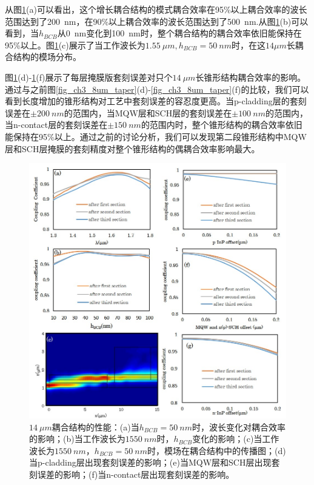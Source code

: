 从图\ref{fig_ch3_14um_taper}(a)可以看出，这个增长耦合结构的模式耦合效率在95\%以上耦合效率的波长范围达到了200~nm，在90\%以上耦合效率的波长范围达到了500~nm.从图\ref{fig_ch3_14um_taper}(b)可以看到，当$h_{BCB}$从0~nm变化到100~nm时，整个耦合结构的耦合效率依旧能保持在95\%以上。图\ref{fig_ch3_14um_taper}(c)展示了当工作波长为$1.55 ~\mu m, h_{BCB} = 50~nm$时，在这$14 \mu m$长耦合结构的模场分布。

图\ref{fig_ch3_14um_taper}(d)-\ref{fig_ch3_14um_taper}(f)展示了每层掩膜版套刻误差对只个$14~\mu m$长锥形结构耦合效率的影响。通过与之前图\ref{fig_ch3_8um_taper}(d)-\ref{fig_ch3_8um_taper}(f)的比较，我们可以看到长度增加的锥形结构对工艺中套刻误差的容忍度更高。当p-cladding层的套刻误差在$\pm 200~nm$的范围内，当MQW层和SCH层的套刻误差在$\pm 100~nm$的范围内，当n-contact层的套刻误差在$\pm 150~nm$的范围内时，整个锥形结构的耦合效率依旧能保持在95\%以上。通过之前的讨论分析，我们可以发现第二段锥形结构中MQW层和SCH层掩膜的套刻精度对整个锥形结构的偶耦合效率影响最大。

\begin{figure}[htb]
	\centering
	\includegraphics[width=14cm]{./Pictures/fig_ch3_14um_taper.jpg}
	\caption{$14~\mu m$耦合结构的性能：(a)当$h_{BCB}=50~nm$时，波长变化对耦合效率的影响；(b)当工作波长为$1550~nm$时，$h_{BCB}$变化的影响；(c)当工作波长为$1550~nm$，$h_{BCB}=50~nm$时，模场在耦合结构中的传播图；(d)当p-cladding层出现套刻误差的影响；(e)当MQW层和SCH层出现套刻误差的影响；(f)当n-contact层出现套刻误差的影响。}
	\label{fig_ch3_14um_taper}
\end{figure}

